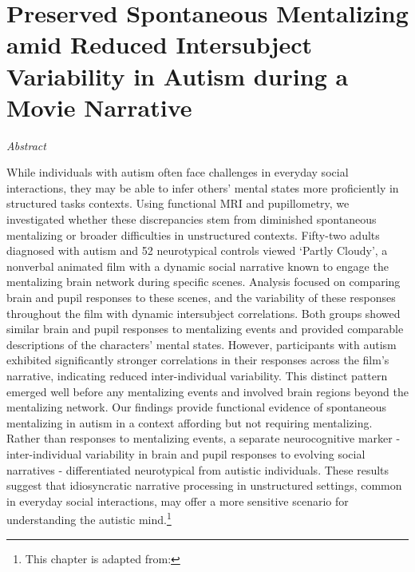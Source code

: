 \cleardoublepage

\chapter{Preserved Spontaneous Mentalizing amid Reduced Intersubject Variability in Autism during a Movie Narrative}
\label{ch:mentalizing_asc}

\begin{center}
    \large\textit{Abstract}
\end{center} 

{\abstractfont 
While individuals with autism often face challenges in everyday social interactions, they may be able to infer others' mental states more proficiently in structured tasks contexts. Using functional MRI and pupillometry, we investigated whether these discrepancies stem from diminished spontaneous mentalizing or broader difficulties in unstructured contexts. Fifty-two adults diagnosed with autism and 52 neurotypical controls viewed `Partly Cloudy', a nonverbal animated film with a dynamic social narrative known to engage the mentalizing brain network during specific scenes. Analysis focused on comparing brain and pupil responses to these scenes, and the variability of these responses throughout the film with dynamic intersubject correlations. Both groups showed similar brain and pupil responses to mentalizing events and provided comparable descriptions of the characters' mental states. However, participants with autism exhibited significantly stronger correlations in their responses across the film's narrative, indicating reduced inter-individual variability. This distinct pattern emerged well before any mentalizing events and involved brain regions beyond the mentalizing network. Our findings provide functional evidence of spontaneous mentalizing in autism in a context affording but not requiring mentalizing. Rather than responses to mentalizing events, a separate neurocognitive marker - inter-individual variability in brain and pupil responses to evolving social narratives - differentiated neurotypical from autistic individuals. These results suggest that idiosyncratic narrative processing in unstructured settings, common in everyday social interactions, may offer a more sensitive scenario for understanding the autistic mind.\footnote{This chapter is adapted from: } \par
} 

\vspace*{\fill} 



